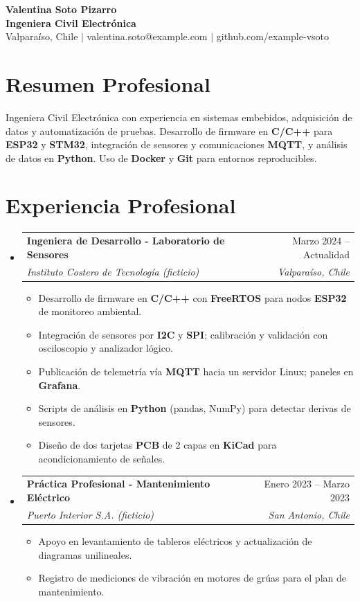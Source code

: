 \documentclass[a4paper,11pt]{article}
\makeatletter
\newcommand{\resumeItem}[1]{\item\small{#1}}
\newcommand{\resumeSubheading}[4]{\item\begin{tabular*}{0.97\textwidth}[t]{l@{\extracolsep{\fill}}r}\textbf{#1} & #2 \\ \textit{\small#3} & \textit{\small #4} \\\end{tabular*}}
\makeatother
\begin{document}
\begin{center}
  \textbf{\Huge Valentina Soto Pizarro} \\
  \textbf{\large Ingeniera Civil Electrónica} \\
  \small Valparaíso, Chile $|$ valentina.soto@example.com $|$ github.com/example-vsoto
\end{center}

\section{Resumen Profesional}
Ingeniera Civil Electrónica con experiencia en sistemas embebidos, adquisición de datos y
automatización de pruebas. Desarrollo de firmware en \textbf{C/C++} para \textbf{ESP32} y
\textbf{STM32}, integración de sensores y comunicaciones \textbf{MQTT}, y análisis de datos
en \textbf{Python}. Uso de \textbf{Docker} y \textbf{Git} para entornos reproducibles.

\section{Experiencia Profesional}
\begin{itemize}[leftmargin=0.15in, label={}]
  \resumeSubheading{Ingeniera de Desarrollo - Laboratorio de Sensores}{Marzo 2024 -- Actualidad}
    {Instituto Costero de Tecnología (ficticio)}{Valparaíso, Chile}
  \begin{itemize}
    \resumeItem{Desarrollo de firmware en \textbf{C/C++} con \textbf{FreeRTOS} para nodos \textbf{ESP32} de monitoreo ambiental.}
    \resumeItem{Integración de sensores por \textbf{I2C} y \textbf{SPI}; calibración y validación con osciloscopio y analizador lógico.}
    \resumeItem{Publicación de telemetría vía \textbf{MQTT} hacia un servidor Linux; paneles en \textbf{Grafana}.}
    \resumeItem{Scripts de análisis en \textbf{Python} (pandas, NumPy) para detectar derivas de sensores.}
    \resumeItem{Diseño de dos tarjetas \textbf{PCB} de 2 capas en \textbf{KiCad} para acondicionamiento de señales.}
  \end{itemize}
  \resumeSubheading{Práctica Profesional - Mantenimiento Eléctrico}{Enero 2023 -- Marzo 2023}
    {Puerto Interior S.A. (ficticio)}{San Antonio, Chile}
  \begin{itemize}
    \resumeItem{Apoyo en levantamiento de tableros eléctricos y actualización de diagramas unilineales.}
    \resumeItem{Registro de mediciones de vibración en motores de grúas para el plan de mantenimiento.}
  \end{itemize}
\end{itemize}
\end{document}

